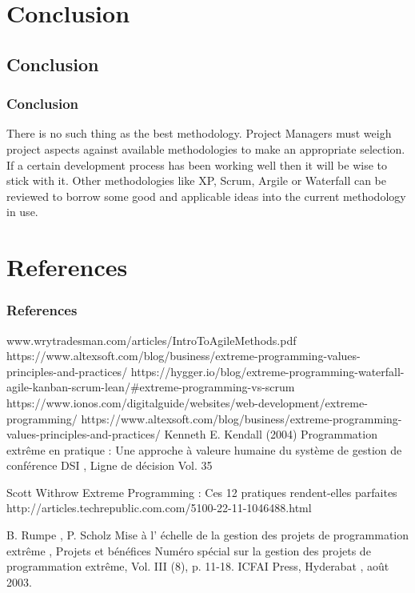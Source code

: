 \documentclass[
	11pt, 
]{beamer}
\begin{document}
\section{Conclusion}
\subsection{Conclusion}
\begin{frame}
	\frametitle{Conclusion}
	There is no such thing as the best methodology. Project Managers must weigh project aspects against available methodologies to make an
	appropriate selection. If a certain development process has been working well then it will be wise to stick with it. Other methodologies like XP,
Scrum, Argile or Waterfall can be reviewed to borrow some good and applicable ideas into the current methodology in use.\cite{p7,p8}
	\bigskip %
\end{frame}
\section{References}
\begin{frame} %
	\frametitle{References}
	
	\begin{thebibliography}{99} %
		\footnotesize %
		
		 www.wrytradesman.com/articles/IntroToAgileMethods.pdf
		https://www.altexsoft.com/blog/business/extreme-programming-values-principles-and-practices/
		https://hygger.io/blog/extreme-programming-waterfall-agile-kanban-scrum-lean/#extreme-programming-vs-scrum
		https://www.ionos.com/digitalguide/websites/web-development/extreme-programming/
		https://www.altexsoft.com/blog/business/extreme-programming-values-principles-and-practices/
			 Kenneth E. Kendall (2004)
			\newblock Programmation extrême en pratique : Une approche à valeure humaine du système de gestion
de conférence DSI , Ligne de décision Vol. 35

			Scott Withrow
			\newblock Extreme Programming : Ces 12 pratiques rendent-elles parfaites
http://articles.techrepublic.com.com/5100-22-11-1046488.html

			 B. Rumpe , P. Scholz
			\newblock Mise à l' échelle de la gestion des projets de programmation extrême , Projets et bénéfices
Numéro spécial sur la gestion des projets de programmation extrême, Vol. III (8), p. 11-18. ICFAI Press, Hyderabat ,
août 2003.
	\end{thebibliography}
\end{frame}
\end{document}
